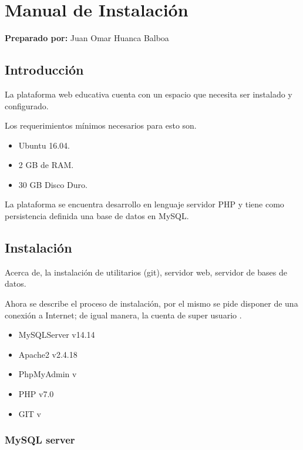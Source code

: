 \chapter{Manual de Instalación}

\begin{center}
	\textbf{Preparado por:} Juan Omar Huanca Balboa
\end{center}

\section{Introducción}

La plataforma web educativa cuenta con un espacio que necesita ser instalado y configurado.

Los requerimientos mínimos necesarios para esto son.

\begin{itemize}

\item Ubuntu 16.04.
\item 2 GB de RAM.
\item 30 GB Disco Duro.

\end{itemize}

La plataforma se encuentra desarrollo en lenguaje servidor PHP y tiene como 
persistencia definida una base de datos en MySQL.

\section{Instalación}

Acerca de, la instalación de utilitarios (git), servidor web, servidor de bases de
datos.

Ahora se describe el proceso de instalación, por el mismo se pide disponer
de una conexión a Internet; de igual manera, la cuenta de super usuario 
.

\begin{itemize}

\item MySQLServer v14.14
\item Apache2 v2.4.18
\item PhpMyAdmin v
\item PHP v7.0
\item GIT v
\end{itemize}

\subsection{MySQL server} \label{ssec:mysqlServer}

